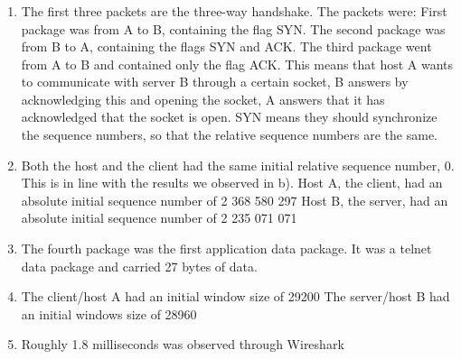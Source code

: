 \documentclass[a4paper]{article}
\begin{document}
\subsubsection{}
\begin{enumerate}[label=\alph*)]
\item The first three packets are the three-way handshake. The packets were:\newline
\newline
First package was from A to B, containing the flag SYN.\newline
The second package was from B to A, containing the flags SYN and ACK.\newline
The third package went from A to B and contained only the flag ACK.\newline
\newline 
This means that host A wants to communicate with server B through a certain socket,
B answers by acknowledging this and opening the socket, A answers that it has acknowledged
that the socket is open. SYN means they should synchronize the sequence numbers, so that
the relative sequence numbers are the same. 


\item Both the host and the client had the same initial relative sequence number, 0. This is in line with the results we observed in b). 
\newline
\newline
Host A, the client, had an absolute initial sequence number of 2 368 580 297\newline
Host  B, the server, had an absolute initial sequence number of 2 235 071 071

\item The fourth package was the first application data package. \newline
It was a telnet data package and carried 27 bytes of data.
\item The client/host A had an initial window size of 29200\newline
The server/host B had an initial windows size of 28960

\item Roughly 1.8 milliseconds was observed through Wireshark
\end{enumerate}
\end{document}
